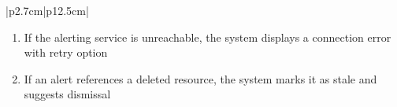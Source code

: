 \begin{table}[H]
\begin{tabular}{|p{2.7cm}|p{12.5cm}|}
\begin{minipage}[t]{\linewidth}
                                      \begin{enumerate}[topsep=0pt,itemsep=1pt,parsep=0pt,partopsep=0pt]
                                          \item If the alerting service is unreachable, the system displays a connection error
                                                with retry option
                                          \item If an alert references a deleted resource, the system marks it as stale and
                                                suggests dismissal
                                      \end{enumerate}
                                  \end{minipage}     \\
        \hline
    \end{tabular}
    \label{tab:admin-system-alerts}
\end{table}
